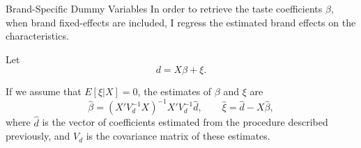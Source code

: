 \documentclass{beamer}
\begin{document}
\begin{frame}[label=heterogeneity]{Brand-Specific Dummy Variables}
	In order to retrieve the taste coefficients $\beta$, when brand fixed-effects are included, I regress the estimated brand effects on the characteristics.

	Let
	$$d=X\beta+\xi.$$

	If we assume that $E[\xi|X]=0$, the estimates of $\beta$ and $\xi$ are
	$$\hat{\beta}=(X'V_d^{-1}X)^{-1}X'V_d^{-1}\hat{d},\qquad \hat{\xi}=\hat{d}-X\hat{\beta},$$
	where $\hat{d}$ is the vector of coefficients estimated from the procedure described previously, and $V_d$ is the covariance matrix of these estimates.
\end{frame}


\end{document}
